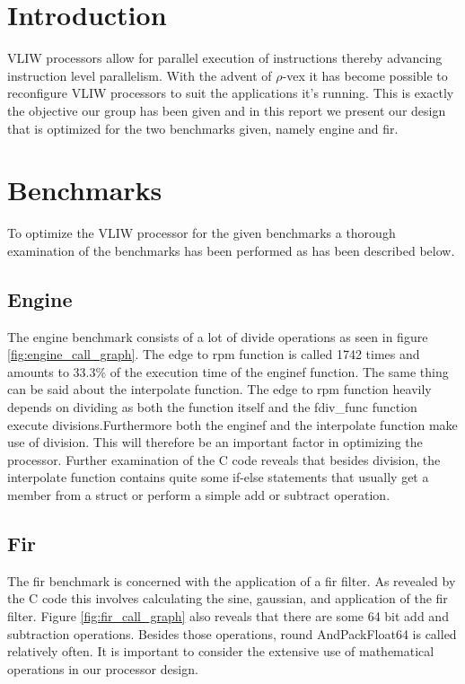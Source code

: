 \section{Introduction}
VLIW processors allow for parallel execution of instructions thereby advancing instruction level parallelism. With the advent of $\rho$-vex it has become possible to reconfigure VLIW processors to suit the applications it's running. This is exactly the objective our group has been given and in this report we present our design that is optimized for the two benchmarks given, namely engine and fir.

\section{Benchmarks}
\label{ch:benchmarks}
To optimize the VLIW processor for the given benchmarks a thorough examination of the benchmarks has been performed as has been described below.

\subsection{Engine}
The engine benchmark consists of a lot of divide operations as seen in figure \ref{fig:engine_call_graph}. The edge to rpm function is called 1742 times and amounts to 33.3\% of the execution time of the enginef function. The same thing can be said about the interpolate function. The edge to rpm function heavily depends on dividing as both the function itself and the fdiv\_func function execute divisions.Furthermore both the enginef and the interpolate function make use of division. This will therefore be an important factor in optimizing the processor. Further examination of the C code reveals that besides division, the interpolate function contains quite some if-else statements that usually get a member from a struct or perform a simple add or subtract operation.

\subsection{Fir}
The fir benchmark is concerned with the application of a fir filter. As revealed by the C code this involves calculating the sine, gaussian, and application of the fir filter. Figure \ref{fig:fir_call_graph} also reveals that there are some 64 bit add and subtraction operations. Besides those operations, round AndPackFloat64 is called relatively often. It is important to consider the extensive use of mathematical operations in our processor design.

